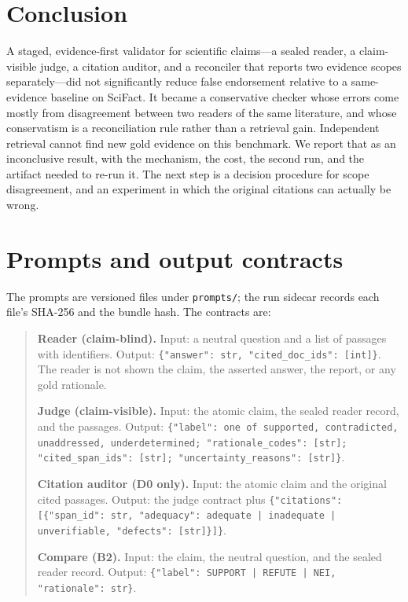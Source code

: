 \documentclass[11pt,a4paper]{article}
\begin{document}
\section{Conclusion}

A staged, evidence-first validator for scientific claims---a sealed
reader, a claim-visible judge, a citation auditor, and a reconciler
that reports two evidence scopes separately---did not significantly
reduce false endorsement relative to a same-evidence baseline on
SciFact. It became a conservative checker whose errors come mostly
from disagreement between two readers of the same literature, and
whose conservatism is a reconciliation rule rather than a retrieval
gain. Independent retrieval cannot find new gold evidence on this
benchmark. We report that as an inconclusive result, with the
mechanism, the cost, the second run, and the artifact needed to re-run
it. The next step is a decision procedure for scope disagreement, and
an experiment in which the original citations can actually be wrong.

\appendix

\section{Prompts and output contracts}
\label{app:prompts}

The prompts are versioned files under \texttt{prompts/}; the run sidecar
records each file's SHA-256 and the bundle hash. The contracts are:

\begin{quote}
\small
\textbf{Reader (claim-blind).} Input: a neutral question and a list of
passages with identifiers. Output: \texttt{\{"answer": str,
"cited\_doc\_ids": [int]\}}. The reader is not shown the claim, the
asserted answer, the report, or any gold rationale.

\textbf{Judge (claim-visible).} Input: the atomic claim, the sealed
reader record, and the passages. Output: \texttt{\{"label": one of
supported, contradicted, unaddressed, underdetermined;
"rationale\_codes": [str]; "cited\_span\_ids": [str];
"uncertainty\_reasons": [str]\}}.

\textbf{Citation auditor (D0 only).} Input: the atomic claim and the
original cited passages. Output: the judge contract plus
\texttt{\{"citations": [\{"span\_id": str, "adequacy": adequate |
inadequate | unverifiable, "defects": [str]\}]\}}.

\textbf{Compare (B2).} Input: the claim, the neutral question, and the
sealed reader record. Output: \texttt{\{"label": SUPPORT | REFUTE |
NEI, "rationale": str\}}.
\end{quote}
\end{document}

